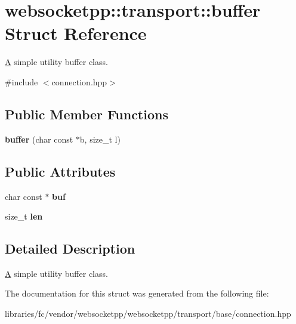 \hypertarget{structwebsocketpp_1_1transport_1_1buffer}{}\section{websocketpp\+:\+:transport\+:\+:buffer Struct Reference}
\label{structwebsocketpp_1_1transport_1_1buffer}


\mbox{\hyperlink{struct_a}{A}} simple utility buffer class.  




{\ttfamily \#include $<$connection.\+hpp$>$}

\subsection*{Public Member Functions}
\begin{DoxyCompactItemize}
\item 
\mbox{\label{structwebsocketpp_1_1transport_1_1buffer_a763623c638a41e3bb479b9b02c8437f2}} 
{\bfseries buffer} (char const $\ast$b, size\+\_\+t l)
\end{DoxyCompactItemize}
\subsection*{Public Attributes}
\begin{DoxyCompactItemize}
\item 
\mbox{\label{structwebsocketpp_1_1transport_1_1buffer_a20572b592e33bf04ce5ffd7bced03c59}} 
char const  $\ast$ {\bfseries buf}
\item 
\mbox{\label{structwebsocketpp_1_1transport_1_1buffer_a89627b29fb3670a3a611ea2737d39821}} 
size\+\_\+t {\bfseries len}
\end{DoxyCompactItemize}


\subsection{Detailed Description}
\mbox{\hyperlink{struct_a}{A}} simple utility buffer class. 

The documentation for this struct was generated from the following file\+:\begin{DoxyCompactItemize}
\item 
libraries/fc/vendor/websocketpp/websocketpp/transport/base/connection.\+hpp\end{DoxyCompactItemize}

